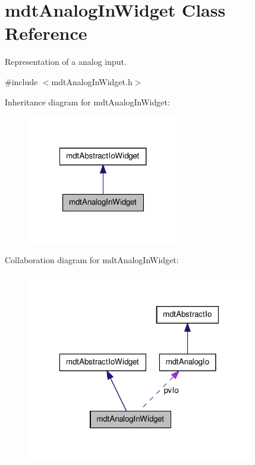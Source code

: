 \hypertarget{classmdt_analog_in_widget}{
\section{mdtAnalogInWidget Class Reference}
\label{classmdt_analog_in_widget}
}


Representation of a analog input.  




{\ttfamily \#include $<$mdtAnalogInWidget.h$>$}



Inheritance diagram for mdtAnalogInWidget:\nopagebreak
\begin{figure}[H]
\begin{center}
\leavevmode
\includegraphics[width=188pt]{classmdt_analog_in_widget__inherit__graph}
\end{center}
\end{figure}


Collaboration diagram for mdtAnalogInWidget:
\nopagebreak
\begin{figure}[H]
\begin{center}
\leavevmode
\includegraphics[width=280pt]{classmdt_analog_in_widget__coll__graph}
\end{center}
\end{figure}
